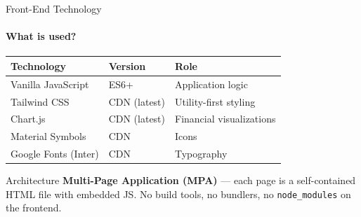 \documentclass[aspectratio=169, 12pt]{beamer}
\begin{document}
\begin{frame}{Front-End Technology}
\framesubtitle{What is used?}

\begin{center}
\begin{tabular}{l l l}
\toprule
\textbf{Technology} & \textbf{Version} & \textbf{Role} \\
\midrule
Vanilla JavaScript & ES6+ & Application logic \\
Tailwind CSS & CDN (latest) & Utility-first styling \\
Chart.js & CDN (latest) & Financial visualizations \\
Material Symbols & CDN & Icons \\
Google Fonts (Inter) & CDN & Typography \\
\bottomrule
\end{tabular}
\end{center}

\vspace{10pt}
\begin{block}{Architecture}
\textbf{Multi-Page Application (MPA)} --- each page is a self-contained HTML file with embedded JS. No build tools, no bundlers, no \texttt{node\_modules} on the frontend.
\end{block}
\end{frame}
\end{document}
